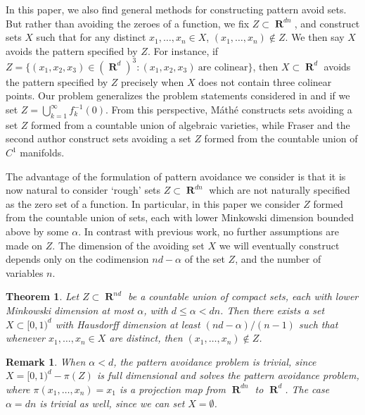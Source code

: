 \documentclass[dvipsnames,letterpaper,12pt]{article}
\numberwithin{equation}{section}
\theoremstyle{plain}
\newtheorem{theorem}{Theorem}
\newtheorem*{remark}{Remark}
\DeclareMathOperator{\RR}{\mathbf{R}}
\begin{document}

In this paper, we also find general methods for constructing pattern avoid sets. But rather than avoiding the zeroes of a function, we fix $Z \subset \RR^{dn}$, and construct sets $X$ such that for any distinct $x_1, \dots, x_n \in X$, $(x_1, \dots, x_n) \not \in Z$. We then say $X$ avoids the pattern specified by $Z$. For instance, if $Z = \{ (x_1,x_2,x_3) \in (\RR^d)^3 : (x_1,x_2,x_3)\ \text{are colinear} \}$, then $X \subset \RR^d$ avoids the pattern specified by $Z$ precisely when $X$ does not contain three colinear points. Our problem generalizes the problem statements considered in \cite{Mathe} and \cite{MalabikaRob} if we set $Z = \bigcup_{k = 1}^\infty f_k^{-1}(0)$. From this perspective, M\'{a}th\'{e} constructs sets avoiding a set $Z$ formed from a countable union of algebraic varieties, while Fraser and the second author construct sets avoiding a set $Z$ formed from the countable union of $C^1$ manifolds.

The advantage of the formulation of pattern avoidance we consider is that it is now natural to consider `rough' sets $Z \subset \RR^{dn}$ which are not naturally specified as the zero set of a function. In particular, in this paper we consider $Z$ formed from the countable union of sets, each with lower Minkowski dimension bounded above by some $\alpha$. In contrast with previous work, no further assumptions are made on $Z$. The dimension of the avoiding set $X$ we will eventually construct depends only on the codimension $nd - \alpha$ of the set $Z$, and the number of variables $n$.

\begin{theorem}\label{mainTheorem}
	Let $Z \subset \RR^{nd}$ be a countable union of compact sets, each with lower Minkowski dimension at most $\alpha$, with $d \leq \alpha < dn$. Then there exists a set $X \subset [0,1)^d$ with Hausdorff dimension at least $(nd - \alpha)/(n-1)$ such that whenever $x_1, \dots, x_n \in X$ are distinct, then $(x_1, \dots, x_n) \not \in Z$.
\end{theorem}

\begin{remark}
	When $\alpha < d$, the pattern avoidance problem is trivial, since $X = [0,1)^d - \pi(Z)$ is full dimensional and solves the pattern avoidance problem, where $\pi(x_1, \dots, x_n) = x_1$ is a projection map from $\RR^{dn}$ to $\RR^d$. The case $\alpha = dn$ is trivial as well, since we can set $X = \emptyset$.

\end{remark}
\end{document}
